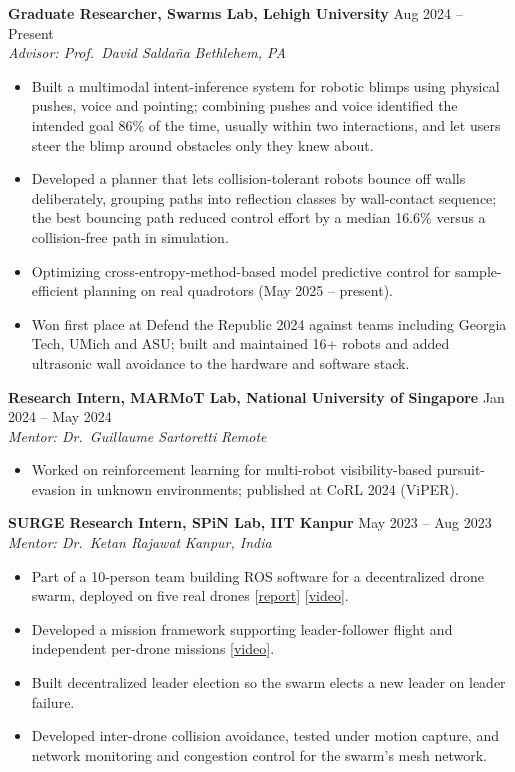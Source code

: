 \documentclass[10pt,letterpaper]{article}
\newcommand{\entry}[4]{%
  \textbf{#1} \hfill #2 \\
  \textit{#3} \hfill \textit{#4}\par\vspace{1pt}}
\begin{document}
\entry{Graduate Researcher, Swarms Lab, Lehigh University}{Aug 2024 -- Present}
      {Advisor: Prof.\ David Salda\~na}{Bethlehem, PA}
\begin{itemize}
  \item Built a multimodal intent-inference system for robotic blimps using physical pushes, voice and pointing;
        combining pushes and voice identified the intended goal 86\% of the time, usually within two interactions,
        and let users steer the blimp around obstacles only they knew about.
  \item Developed a planner that lets collision-tolerant robots bounce off walls deliberately, grouping paths into
        reflection classes by wall-contact sequence; the best bouncing path reduced control effort by a median
        16.6\% versus a collision-free path in simulation.
  \item Optimizing cross-entropy-method-based model predictive control for sample-efficient planning on
        real quadrotors (May 2025 -- present).
  \item Won first place at Defend the Republic 2024 against teams including Georgia Tech, UMich and ASU;
        built and maintained 16+ robots and added ultrasonic wall avoidance to the hardware and software stack.
\end{itemize}

\entry{Research Intern, MARMoT Lab, National University of Singapore}{Jan 2024 -- May 2024}
      {Mentor: Dr.\ Guillaume Sartoretti}{Remote}
\begin{itemize}
  \item Worked on reinforcement learning for multi-robot visibility-based pursuit-evasion in unknown
        environments; published at CoRL 2024 (ViPER).
\end{itemize}

\entry{SURGE Research Intern, SPiN Lab, IIT Kanpur}{May 2023 -- Aug 2023}
      {Mentor: Dr.\ Ketan Rajawat}{Kanpur, India}
\begin{itemize}
  \item Part of a 10-person team building ROS software for a decentralized drone swarm, deployed on five real drones
        [\href{https://drive.google.com/drive/folders/1TChMz4PDQW4giv97GUWhrWedk10NNIpQ}{report}]
        [\href{https://youtu.be/Jn5sE0hCgE8}{video}].
  \item Developed a mission framework supporting leader-follower flight and independent per-drone missions
        [\href{https://youtu.be/xq_rb1A7OfA}{video}].
  \item Built decentralized leader election so the swarm elects a new leader on leader failure.
  \item Developed inter-drone collision avoidance, tested under motion capture, and network monitoring and
        congestion control for the swarm's mesh network.
\end{itemize}
\end{document}
